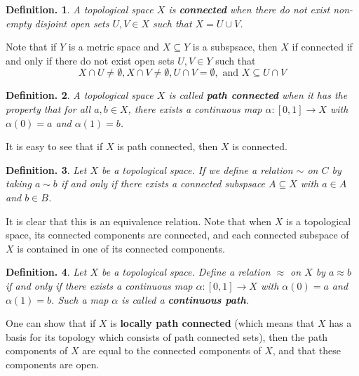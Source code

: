 \documentclass[11pt, a4paper]{memoir}
\theoremstyle{change}
\theoremstyle{plain}
\theoremstyle{nonumberplain}
\newtheorem{definition}{Definition.}
\numberwithin{equation}{section}
\begin{document}
\begin{definition}
    A topological space $X$ is \textbf{connected} when there do not exist non-empty disjoint open sets $U,V\in X$ such that $X=U\cup V$.
\end{definition}
Note that if $Y$ is a metric space and $X\subseteq Y$ is a subspsace, then $X$ if connected if and only if there do not exist open sets $U,V\in Y$ such that
\begin{equation*}
    X\cap U\neq\emptyset, X\cap V\neq\emptyset, U\cap V=\emptyset,\text{ and }X\subseteq U\cap V
\end{equation*}
\begin{definition}
    A topological space $X$ is called \textbf{path connected} when it has the property that for all $a,b\in X$, there exists a continuous map $\alpha:[0,1]\to X$ with $\alpha(0)=a$ and $\alpha(1)=b$.
\end{definition}
It is easy to see that if $X$ is path connected, then $X$ is connected.
\begin{definition}
    Let $X$ be a topological space.
    If we define a relation $\sim$ on $C$ by taking $a\sim b$ if and only if there exists a connected subspsace $A\subseteq X$ with $a\in A$ and $b\in B$.
\end{definition}
It is clear that this is an equivalence relation.
Note that when $X$ is a topological space, its connected components are connected, and each connected subspace of $X$ is contained in one of its connected components.
\begin{definition}
    Let $X$ be a topological space.
    Define a relation $\approx$ on $X$ by $a\approx b$ if and only if there exists a continuous map $\alpha:[0,1]\to X$ with $\alpha(0)=a$ and $\alpha(1)=b$.
    Such a map $\alpha$ is called a \textbf{continuous path}.
\end{definition}
One can show that if $X$ is \textbf{locally path connected} (which means that $X$ has a basis for its topology which consists of path connected sets), then the path components of $X$ are equal to the connected components of $X$, and that these components are open.
\end{document}
